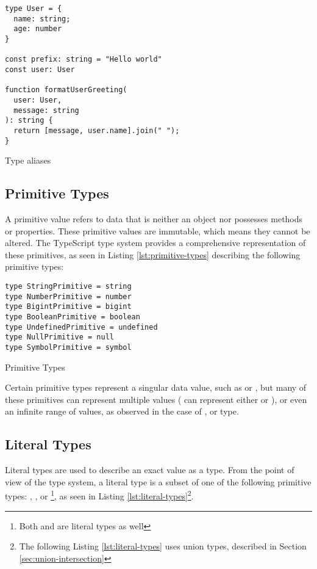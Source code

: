 \begin{listing}[ht]
  \begin{verbatim}
type User = {
  name: string;
  age: number
}

const prefix: string = "Hello world"
const user: User

function formatUserGreeting(
  user: User, 
  message: string
): string {
  return [message, user.name].join(" ");
}
\end{verbatim}
  \caption{Type aliases}\label{lst:type-aliases}
\end{listing}

\subsection{Primitive Types}

A primitive value refers to data that is neither an object nor possesses methods or properties. These primitive values are immutable, which means they cannot be altered. The TypeScript type system provides a comprehensive representation of these primitives, as seen in Listing \ref{lst:primitive-types} describing the following primitive types:

\begin{listing}[ht]
  \begin{verbatim}
type StringPrimitive = string
type NumberPrimitive = number
type BigintPrimitive = bigint
type BooleanPrimitive = boolean
type UndefinedPrimitive = undefined
type NullPrimitive = null
type SymbolPrimitive = symbol
\end{verbatim}
  \caption{Primitive Types}\label{lst:primitive-types}
\end{listing}

Certain primitive types represent a singular data value, such as  or , but many of these primitives can represent multiple values ( can represent either  or ), or even an infinite range of values, as observed in the case of ,  or  type.

\subsection{Literal Types}

Literal types are used to describe an exact value as a type. From the point of view of the type system, a literal type is a subset of one of the following primitive types: , ,  or \footnote{Both  and  are literal types as well}, as seen in Listing \ref{lst:literal-types}\footnote{The following Listing \ref{lst:literal-types} uses union types, described in Section \ref{sec:union-intersection}}.

